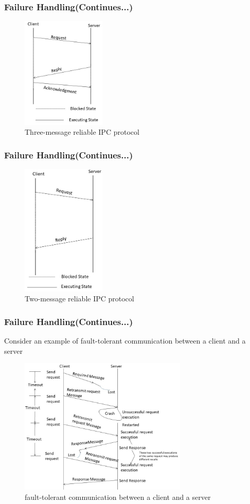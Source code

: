 \documentclass{beamer}
\begin{document}
\begin{frame}
	\frametitle{Failure Handling(Continues...)}
	\begin{figure}
		\centering
		\includegraphics[width=4cm]{fig38.jpg}
		\caption{Three-message reliable IPC protocol}
	\end{figure}	
\end{frame}	

\begin{frame}
	\frametitle{Failure Handling(Continues...)}
	\begin{figure}
		\centering
		\includegraphics[width=4cm]{fig39.jpg}
		\caption{Two-message reliable IPC protocol}
	\end{figure}	
\end{frame}	


\begin{frame}
	\frametitle{Failure Handling(Continues...)}
	Consider an example of fault-tolerant communication between a client and a server
	\begin{figure}
		\centering
		\includegraphics[width=8cm]{fig310.jpg}
		\caption{fault-tolerant communication between a client and a server}
	\end{figure}	
\end{frame}	
\end{document}
